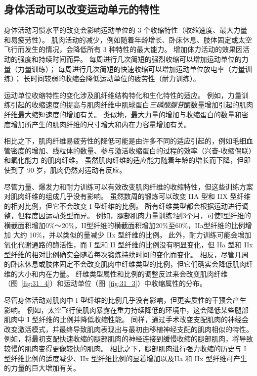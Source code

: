 \subsection{身体活动可以改变运动单元的特性}

身体活动习惯水平的改变会影响运动单位的 3 个收缩特性（收缩速度、最大力量和易疲劳性）。
肌肉活动的减少，例如随着年龄增长、卧床休息、肢体固定或太空飞行而发生的情况，会降低所有 3 种特性的最大能力。
增加体力活动的效果因活动的强度和持续时间而异。
每周进行几次简短的强烈收缩可以增加运动单位的力量（力量训练）；
每周进行几次简短的快速收缩可以增加运动单位放电率（力量训练）；
长时间较弱的收缩会降低运动单位的疲劳性（耐力训练）。


运动单位收缩特性的变化涉及肌纤维结构特化和生化特性的适应。
例如，力量训练引起的收缩速度的提高与肌肉纤维中肌球蛋白\textit{三磷酸腺苷}酶数量增加引起的肌肉纤维最大缩短速度的增加有关。
类似地，最大力量的增加与收缩蛋白的数量和密度增加所产生的肌肉纤维的尺寸增大和内在力容量增加有关。


相比之下，肌肉纤维易疲劳性的降低可能是由许多不同的适应引起的，例如毛细血管密度的增加、线粒体的数量、参与激活收缩蛋白的过程的效率（兴奋-收缩偶联）和氧化能力 的肌肉纤维。
虽然肌肉纤维的适应能力随着年龄的增长而下降，但即使到了 90 岁，肌肉仍然对运动有反应。


尽管力量、爆发力和耐力训练可以有效改变肌肉纤维的收缩特性，但这些训练方案对肌肉纤维的组成几乎没有影响。
虽然数周的锻炼可以改变 IIA 型和 IIX 型纤维的相对比例，但它不会改变 I 型纤维的比例。
所有纤维类型都会根据运动进行调整，但程度因运动类型而异。
例如，腿部肌肉力量训练2到3个月，可使I型纤维的横截面积增加0\%～20\%，II型纤维的横截面积增加20\%至60\%，IIa型纤维的比例增加 大约 10\%，并以类似的量减少 IIx 型纤维的比例。
此外，耐力训练可能会增加氧化代谢通路的酶活性，而 I 型和 II 型纤维的比例没有明显变化，但 IIa 型和 IIx 型纤维的相对比例确实会随着每次锻炼持续时间的变化而变化。
相反，尽管几周的卧床休息或肢体固定不会改变肌肉中纤维类型的比例，但它们确实会降低肌肉纤维的大小和内在力量。
纤维类型属性和比例的调整反过来会改变肌肉纤维（图~\ref{fig:31_4}）和运动单位（图~\ref{fig:31_3}）中收缩属性的分布。


尽管身体活动对肌肉中 I 型纤维的比例几乎没有影响，但更实质性的干预会产生影响。
例如，太空飞行使肌肉暴露在重力持续降低的环境中，这会降低某些腿部肌肉中 I 型纤维的比例并降低收缩性能。
同样，通过手术改变支配肌肉的神经会改变激活模式，并最终导致肌肉表现出与最初由移植神经支配的肌肉相似的特性。
例如，将最初支配快速收缩的腿部肌肉的神经连接到缓慢收缩的腿部肌肉，将导致较慢的肌肉变得更像较快的肌肉。
相比之下，腿部肌肉进行强力收缩的历史与 I 型纤维比例的适度减少、IIx 型纤维比例的显着增加以及IIa 和 IIx 型纤维可产生的力量的巨大增加有关。 



